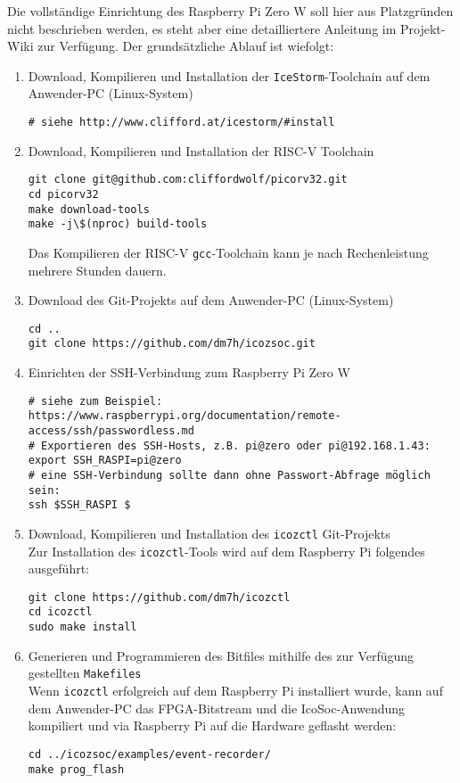 Die vollständige Einrichtung des Raspberry Pi Zero W soll hier aus Platzgründen nicht beschrieben werden, es steht aber eine detailliertere Anleitung im Projekt-Wiki zur Verfügung.
Der grundsätzliche Ablauf ist wiefolgt:
\begin{enumerate}

\item Download, Kompilieren und Installation der {\tt IceStorm}-Toolchain auf dem Anwender-PC (Linux-System)

\begin{verbatim}
# siehe http://www.clifford.at/icestorm/#install
\end{verbatim}

\item Download, Kompilieren und Installation der RISC-V Toolchain

\begin{verbatim}
git clone git@github.com:cliffordwolf/picorv32.git
cd picorv32
make download-tools
make -j\$(nproc) build-tools
\end{verbatim}

Das Kompilieren der RISC-V {\tt gcc}-Toolchain kann je nach Rechenleistung mehrere Stunden dauern.

\item Download des Git-Projekts auf dem Anwender-PC (Linux-System)

\begin{verbatim}
cd ..
git clone https://github.com/dm7h/icozsoc.git
\end{verbatim}


\item Einrichten der SSH-Verbindung zum Raspberry Pi Zero W 

\begin{verbatim}
# siehe zum Beispiel: https://www.raspberrypi.org/documentation/remote-access/ssh/passwordless.md
# Exportieren des SSH-Hosts, z.B. pi@zero oder pi@192.168.1.43:
export SSH_RASPI=pi@zero
# eine SSH-Verbindung sollte dann ohne Passwort-Abfrage möglich sein:
ssh $SSH_RASPI $
\end{verbatim}

\item Download, Kompilieren und Installation des {\tt icozctl} Git-Projekts\\ 
Zur Installation des {\tt icozctl}-Tools wird auf dem Raspberry Pi folgendes ausgeführt:
\begin{verbatim}
git clone https://github.com/dm7h/icozctl
cd icozctl
sudo make install
\end{verbatim}

\item Generieren und Programmieren des Bitfiles mithilfe des zur Verfügung gestellten {\tt Makefiles}\\
Wenn {\tt icozctl} erfolgreich auf dem Raspberry Pi installiert wurde, kann auf dem Anwender-PC das FPGA-Bitstream und die 
IcoSoc-Anwendung kompiliert und via Raspberry Pi auf die Hardware geflasht werden:
\begin{verbatim}
cd ../icozsoc/examples/event-recorder/
make prog_flash
\end{verbatim}

 
\end{enumerate}

